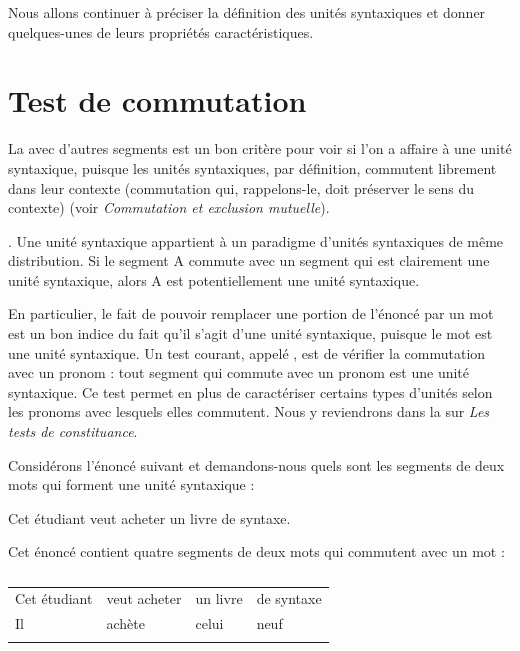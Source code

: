 Nous allons continuer à préciser la définition des unités syntaxiques et donner quelques-unes de leurs propriétés caractéristiques.

\section{Test de commutation}\label{sec:3.2.10}

La  avec d’autres segments est un bon critère pour voir si l’on a affaire à une unité syntaxique, puisque les unités syntaxiques, par définition, commutent librement dans leur contexte (commutation qui, rappelons-le, doit préserver le sens du contexte) (voir  \textit{Commutation et exclusion mutuelle}).

\begin{styleLivreImportant}
. Une unité syntaxique appartient à un paradigme d’unités syntaxiques de même distribution. Si le segment A commute avec un segment qui est clairement une unité syntaxique, alors A est potentiellement une unité syntaxique.
\end{styleLivreImportant}

En particulier, le fait de pouvoir remplacer une portion de l’énoncé par un mot est un bon indice du fait qu’il s’agit d’une unité syntaxique, puisque le mot est une unité syntaxique. Un test courant, appelé , est de vérifier la commutation avec un pronom : tout segment qui commute avec un pronom est une unité syntaxique. Ce test permet en plus de caractériser certains types d’unités selon les pronoms avec lesquels elles commutent. Nous y reviendrons dans la  sur \textit{Les tests de constituance}.

Considérons l’énoncé suivant et demandons-nous quels sont les segments de deux mots qui forment une unité syntaxique :

\ea
    {Cet étudiant veut acheter un livre de syntaxe.}
\z

Cet énoncé contient quatre segments de deux mots qui commutent avec un mot :

\begin{table}
\caption{\label{tab:}}
\begin{tabularx}{\textwidth}{XXXX}
\lsptoprule
{ Cet étudiant} & { veut acheter} & { un livre} & { de syntaxe}\\
{ Il} & { achète} & { celui} & { neuf}\\
\lspbottomrule
\end{tabularx}
\end{table}

